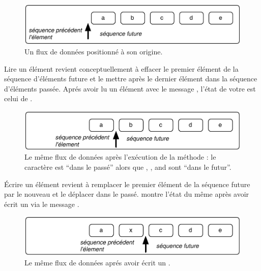 \documentclass[a4paper,10pt,twoside]{book}
\begin{document}
\begin{figure}[ht]
\centerline{\includegraphics[scale=0.5]{_abcdeStef}}
\caption{Un flux de donn\'ees positionn\'e \`a son origine.}
\label{fig:_abcde}
\vspace{.2in}
\end{figure}

Lire un \'el\'ement revient conceptuellement \`a effacer le premier \'el\'ement de la s\'equence d'\'el\'ements future et le mettre apr\`es le dernier \'el\'ement dans la s\'equence d'\'el\'ements pass\'ee.
Apr\'es avoir lu un \'el\'ement avec le message , l'\'etat de votre \stream est celui de .

\begin{figure}[ht]
\centerline{\includegraphics[scale=0.5]{a_bcdeStef}}
\caption{Le m\^eme flux de donn\'ees apr\`es l'ex\'ecution de la m\'ethode : le caract\`ere  est ``dans le pass\'e'' alors que , ,  and  sont ``dans le futur''.}
\label{fig:a_bcde}
\vspace{.2in}
\end{figure}

\'Ecrire un \'el\'ement revient \`a remplacer le premier \'el\'ement de la s\'equence future par le nouveau et le d\'eplacer dans le pass\'e.  montre l'\'etat du m\^eme \stream apr\`es avoir \'ecrit un  via le message  .

\begin{figure}[h!t]
\centerline{\includegraphics[scale=0.5]{ax_cdeStef}}
\caption{Le m\^eme flux de donn\'ees apr\'es avoir \'ecrit un .}
\label{fig:ax_cde}
\vspace{.2in}
\end{figure}
\end{document}
